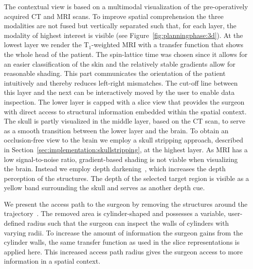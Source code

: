 \documentclass[review]{vgtc}                 %
\begin{document}
The contextual view is based on a multimodal visualization of the pre-operatively acquired CT and MRI scans. To improve spatial comprehension the three modalities are not fused but vertically separated such that, for each layer, the modality of highest interest is visible (see Figure~\ref{fig:planningphase:3d}). At the lowest layer we render the T$_1$-weighted MRI with a transfer function that shows the whole head of the patient. The spin-lattice time was chosen since it allows for an easier classification of the skin and the relatively stable gradients allow for reasonable shading. This part communicates the orientation of the patient intuitively and thereby reduces left-right mismatches. The cut-off line between this layer and the next can be interactively moved by the user to enable data inspection. The lower layer is capped with a slice view that provides the surgeon with direct access to structural information embedded within the spatial context. The skull is partly visualized in the middle layer, based on the CT scan, to serve as a smooth transition between the lower layer and the brain. To obtain an occlusion-free view to the brain we employ a skull stripping approach, described in Section~\ref{sec:implementation:skullstripping}, at the highest layer. As MRI has a low signal-to-noise ratio, gradient-based shading is not viable when visualizing the brain. Instead we employ depth darkening~\cite{Luft2005}, which increases the depth perception of the structures. The depth of the selected target region is visible as a yellow band surrounding the skull and serves as another depth cue.

We present the access path to the surgeon by removing the structures around the trajectory~\cite{Weiskopf2002,Rieder2008}. The removed area is cylinder-shaped and possesses a variable, user-defined radius such that the surgeon can inspect the walls of cylinders with varying radii. To increase the amount of information the surgeon gains from the cylinder walls, the same transfer function as used in the slice representations is applied here. This increased access path radius gives the surgeon access to more information in a spatial context.
\end{document}
